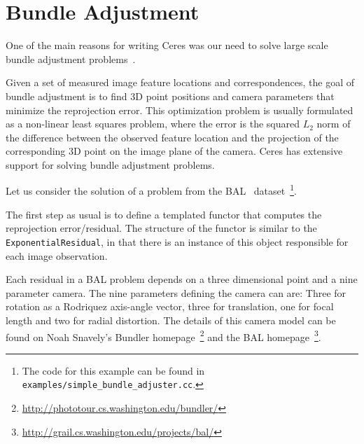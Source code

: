 \chapter{Bundle Adjustment}
\label{chapter:tutorial:bundleadjustment}
One of the main reasons for writing Ceres was our need to solve large scale bundle adjustment problems~\cite{hartley-zisserman-book-2004,triggs-etal-1999}.

Given a set of measured image feature locations and correspondences, the goal of bundle adjustment is to find 3D point positions and camera parameters that minimize the reprojection error. This optimization problem is usually formulated as a non-linear least squares problem, where the error is the squared $L_2$ norm of the difference between the observed feature location and the projection of the corresponding 3D point on the image plane of the camera. Ceres has extensive support for solving bundle adjustment problems. 

Let us consider the solution of a problem from the BAL~\cite{Agarwal10bal} dataset~\footnote{The code for this example can be found in \texttt{examples/simple\_bundle\_adjuster.cc}.}. 

The first step as usual is to define a templated functor that computes the reprojection error/residual. The structure of the functor is similar to the \texttt{ExponentialResidual}, in that there is an instance of this object responsible for each image observation.


Each residual in a BAL problem depends on a three dimensional point and a nine parameter
camera. The nine parameters defining the camera can are: Three for rotation as a Rodriquez axis-angle vector, three for translation, one for focal length and two for radial distortion.  The details of this camera model can be found on Noah
Snavely's Bundler
homepage~\footnote{\url{http://phototour.cs.washington.edu/bundler/}}
and the BAL
homepage~\footnote{\url{http://grail.cs.washington.edu/projects/bal/}}.



